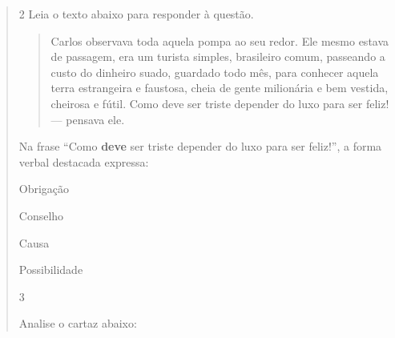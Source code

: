 {\begin{quote}
\num{2} Leia o texto abaixo para responder à questão. 

\begin{quote}

Carlos observava toda aquela pompa ao seu redor. Ele mesmo estava de passagem,
era um turista simples, brasileiro comum, passeando a custo do dinheiro suado, 
guardado todo mês, para conhecer aquela terra estrangeira e faustosa, cheia de 
gente milionária e bem vestida, cheirosa e fútil. Como deve ser triste depender
do luxo para ser feliz! --- pensava ele.     

\end{quote}


Na frase ``Como \textbf{deve} ser triste depender do luxo para ser feliz!'', 
a forma verbal destacada expressa:

\begin{escolha}
  
  \item Obrigação
  
  \item Conselho
  
  \item Causa
  
  \item Possibilidade

\end{escolha}


\num{3}

Analise o cartaz abaixo:


\end{quote}}
